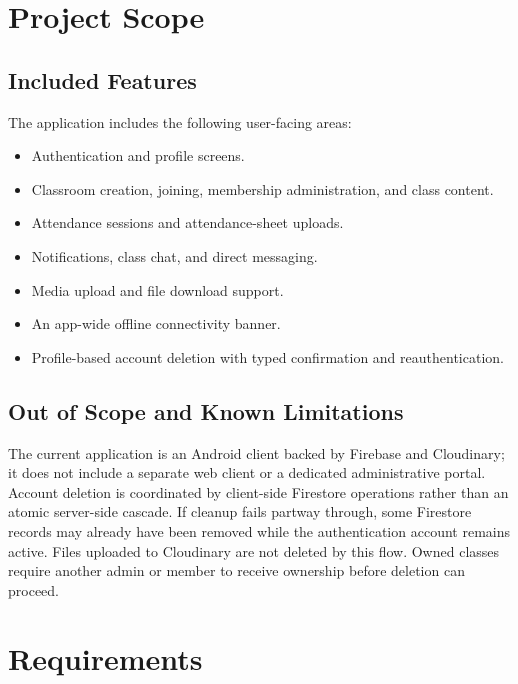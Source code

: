 \documentclass[12pt,a4paper]{report}
\begin{document}
\chapter{Project Scope}
\section{Included Features}
The application includes the following user-facing areas:
\begin{itemize}[leftmargin=*]
    \item Authentication and profile screens.
    \item Classroom creation, joining, membership administration, and class content.
    \item Attendance sessions and attendance-sheet uploads.
    \item Notifications, class chat, and direct messaging.
    \item Media upload and file download support.
    \item An app-wide offline connectivity banner.
    \item Profile-based account deletion with typed confirmation and reauthentication.
\end{itemize}

\section{Out of Scope and Known Limitations}
The current application is an Android client backed by Firebase and Cloudinary; it
does not include a separate web client or a dedicated administrative portal. Account
deletion is coordinated by client-side Firestore operations rather than an atomic
server-side cascade. If cleanup fails partway through, some Firestore records may
already have been removed while the authentication account remains active. Files
uploaded to Cloudinary are not deleted by this flow. Owned classes require another
admin or member to receive ownership before deletion can proceed.

\chapter{Requirements}
\end{document}
